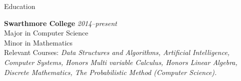 \documentclass[12pt]{resume} %
\begin{document}

\begin{rSection}{Education}

{\bf Swarthmore College}  \hfill {\em 2014--present} \\
Major in Computer Science\\
Minor in Mathematics\\
Relevant Courses:
{\em
    Data Structures and Algorithms,
    Artificial Intelligence,
    Computer Systems,
    Honors Multi variable Calculus,
    Honors Linear Algebra,
    Discrete Mathematics,
    The Probabilistic Method (Computer Science).\\
}

\end{rSection}

\end{document}

